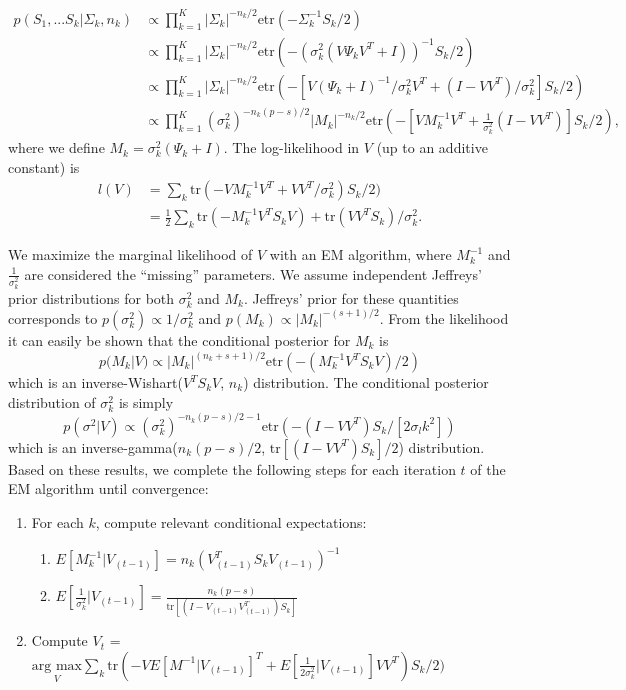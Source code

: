 \documentclass[12pt]{article}
\newcommand{\tr}{\text{tr}}
\newcommand{\etr}{\text{etr}}
\begin{document}
\begin{align}
\nonumber p(S_1, ... S_k | \Sigma_k,n_k) &\propto \prod_{k=1}^K |\Sigma_k|^{-n_k/2}\etr(-\Sigma_k^{-1}S_k/2)  \\
\nonumber &\propto \prod_{k=1}^K  |\Sigma_k|^{-n_k/2}\etr(-(\sigma_k^2(V\Psi_kV^T +
  I))^{-1}S_k/2) \\
\nonumber &\propto \prod_{k=1}^K  |\Sigma_k|^{-n_k/2}\etr(-\left[V(\Psi_k +
  I)^{-1}/\sigma_k^2 V^T + (I-VV^T)/\sigma^2_k\right]S_k/2)
  \\
&\propto \prod_{k=1}^K  (\sigma_k^2)^{-n_k(p-s)/2}|M_k|^{-n_k/2}\etr(-\left[VM_k^{-1}V^T + \frac{1}{\sigma^2_k} (I-VV^T)\right]S_k/2) ,
\end{align}
%
\noindent where we define $M_k = \sigma_k^2(\Psi_k + I)$.  The log-likelihood in
$V$ (up to an additive constant) is
%
\begin{align}
\nonumber l(V) &= \sum_k \tr\left(-VM_k^{-1}V^T +
       VV^T/\sigma^2_k\right)S_k/2)\\
&= \frac{1}{2}\sum_k \tr\left(-M_k^{-1}V^T S_kV\right) + \text{tr}\left(VV^T S_k\right)/\sigma_k^2.
\end{align}


We maximize the marginal likelihood of $V$ with an EM algorithm, where
$M_k^{-1}$ and $\frac{1}{\sigma_k^2}$ are considered the
``missing'' parameters.  We assume independent Jeffreys'
prior distributions for both $\sigma_k^2$ and $M_k$.  Jeffreys' prior
for these quantities corresponds to
$p(\sigma_k^2) \propto 1/\sigma_k^2$ and
$p(M_k) \propto |M_k|^{-(s+1)/2}$.  From the likelihood it can easily
be shown that the conditional posterior for $M_k$ is
%
$$p(M_k | V) \propto |M_k|^{(n_k + s + 1)/2}\etr(-(M_k^{-1}V^TS_kV)/2) $$
%
\noindent which is an inverse-Wishart($V^TS_kV$, $n_k$) distribution.  The
conditional posterior distribution of $\sigma_k^2$ is simply
%
$$p\left(\sigma^2 | V\right) \propto (\sigma_k^2)^{-n_k(p-s)/2-1}\etr\left(- (I-VV^T)S_k/[2\sigma_lk^2]\right)  $$
%
\noindent which is an inverse-gamma($n_k(p-s)/2$,
$\text{tr}[(I-VV^T)S_k]/2$) distribution.  Based on these
results, we complete the following steps for each iteration $t$ of
the EM algorithm until convergence:

\begin{enumerate}
\item For each $k$, compute relevant conditional expectations:
\begin{enumerate}
\item $E[M_k^{-1} | V_{(t-1)}] = n_k(V_{(t-1)}^T S_kV_{(t-1)})^{-1}$
\item $E[\frac{1}{\sigma_k^2}|V_{(t-1)}] = \frac{n_k(p-s)}{\text{tr}[(I-V_{(t-1)}V_{(t-1)}^T)S_k]}$
\end{enumerate}
\item Compute $V_{t}$ = $\underset{V}{\text{arg } \text{max}}  \sum_k \text{tr}\left(-VE[M^{-1}|V_{(t-1)}]^T +
       E[\frac{1}{2\sigma_k^2}|V_{(t-1)}]VV^T\right)S_k/2)$ 
\end{enumerate}
\end{document}
